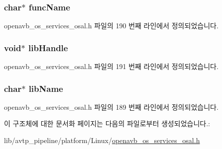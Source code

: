 \subsubsection[{\texorpdfstring{func\+Name}{funcName}}]{\setlength{\rightskip}{0pt plus 5cm}char$\ast$ func\+Name}\hypertarget{structlink__lib__t_addbfd1b084d058346b6bae0977f5a3b4}{}\label{structlink__lib__t_addbfd1b084d058346b6bae0977f5a3b4}


openavb\+\_\+os\+\_\+services\+\_\+osal.\+h 파일의 190 번째 라인에서 정의되었습니다.

\subsubsection[{\texorpdfstring{lib\+Handle}{libHandle}}]{\setlength{\rightskip}{0pt plus 5cm}void$\ast$ lib\+Handle}\hypertarget{structlink__lib__t_ac1ad32e1d3b42ed9d2b736f7fbe5d4fb}{}\label{structlink__lib__t_ac1ad32e1d3b42ed9d2b736f7fbe5d4fb}


openavb\+\_\+os\+\_\+services\+\_\+osal.\+h 파일의 191 번째 라인에서 정의되었습니다.

\subsubsection[{\texorpdfstring{lib\+Name}{libName}}]{\setlength{\rightskip}{0pt plus 5cm}char$\ast$ lib\+Name}\hypertarget{structlink__lib__t_a11ada1981f0d75f739f5e8949d9a3c20}{}\label{structlink__lib__t_a11ada1981f0d75f739f5e8949d9a3c20}


openavb\+\_\+os\+\_\+services\+\_\+osal.\+h 파일의 189 번째 라인에서 정의되었습니다.



이 구조체에 대한 문서화 페이지는 다음의 파일로부터 생성되었습니다.\+:\begin{DoxyCompactItemize}
\item 
lib/avtp\+\_\+pipeline/platform/\+Linux/\hyperlink{openavb__os__services__osal_8h}{openavb\+\_\+os\+\_\+services\+\_\+osal.\+h}\end{DoxyCompactItemize}
